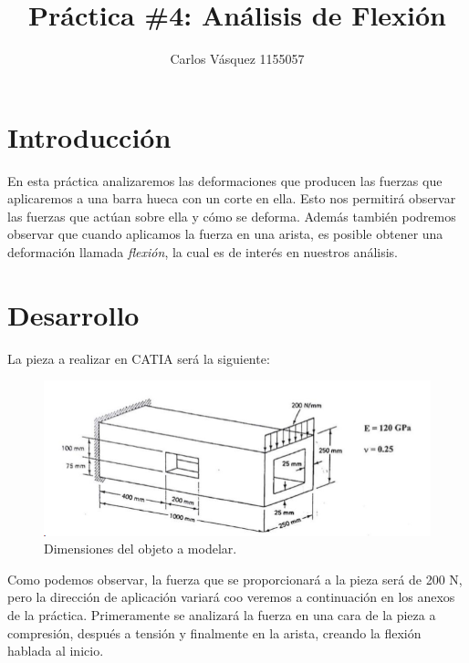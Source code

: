 \documentclass[12pt, letterpaper]{article}
\title{Práctica \#4: Análisis de Flexión}
\author{Carlos Vásquez 1155057}
\begin{document}
\maketitle
\section*{Introducción}
En esta práctica analizaremos las deformaciones que producen las fuerzas que aplicaremos a una barra hueca con un corte en ella. Esto nos permitirá observar las fuerzas que actúan sobre ella y cómo se deforma. Además también podremos observar que cuando aplicamos la fuerza en una arista, es posible obtener una deformación llamada \textit{flexión}, la cual es de interés en nuestros análisis.
\section*{Desarrollo}
La pieza a realizar en CATIA será la siguiente:

\begin{figure}[H]
	\centering
	\includegraphics[width=\textwidth]{plane.png}
	\caption{Dimensiones del objeto a modelar.}
\end{figure}

Como podemos observar, la fuerza que se proporcionará a la pieza será de 200 N, pero la dirección de aplicación variará coo veremos a continuación en los anexos de la práctica. Primeramente se analizará la fuerza en una cara de la pieza a compresión, después a tensión y finalmente en la arista, creando la flexión hablada al inicio.
\end{document}
